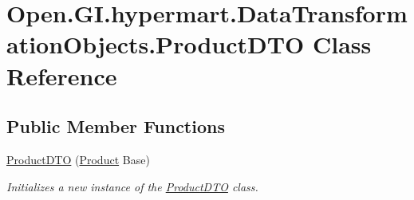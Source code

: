 \hypertarget{class_open_1_1_g_i_1_1hypermart_1_1_data_transformation_objects_1_1_product_d_t_o}{}\section{Open.\+G\+I.\+hypermart.\+Data\+Transformation\+Objects.\+Product\+D\+T\+O Class Reference}
\label{class_open_1_1_g_i_1_1hypermart_1_1_data_transformation_objects_1_1_product_d_t_o}


 


\subsection*{Public Member Functions}
\begin{DoxyCompactItemize}
\item 
\hyperlink{class_open_1_1_g_i_1_1hypermart_1_1_data_transformation_objects_1_1_product_d_t_o_a8c9e47c3068eae571f08076a67e95348}{Product\+D\+T\+O} (\hyperlink{class_open_1_1_g_i_1_1hypermart_1_1_models_1_1_product}{Product} Base)
\begin{DoxyCompactList}\small\item\em Initializes a new instance of the \hyperlink{class_open_1_1_g_i_1_1hypermart_1_1_data_transformation_objects_1_1_product_d_t_o}{Product\+D\+T\+O} class. \end{DoxyCompactList}\end{DoxyCompactItemize}
